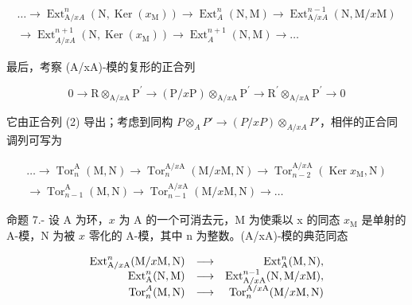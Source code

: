 \[
\begin{array}{c} \dots \longrightarrow \operatorname{Ext} _ {\mathrm{A} / x A} ^ {n} (\mathrm{N}, \operatorname{Ker} (x _ {\mathrm{M}})) \longrightarrow \operatorname{Ext} _ {A} ^ {n} (\mathrm{N}, \mathrm{M}) \longrightarrow \operatorname{Ext} _ {\mathrm{A} / x A} ^ {n - 1} (\mathrm{N}, \mathrm{M} / x \mathrm{M}) \\ \longrightarrow \operatorname{Ext} _ {A / x A} ^ {n + 1} (\mathrm{N}, \operatorname{Ker} (x _ {\mathrm{M}})) \longrightarrow \operatorname{Ext} _ {A} ^ {n + 1} (\mathrm{N}, \mathrm{M}) \longrightarrow \dots \end{array}\tag{5}
\]

最后，考察 (A/xA)-模的复形的正合列

\[
0 \rightarrow \mathrm{R} \otimes_ {\mathrm{A} / x \mathrm{A}} \mathrm{P} ^ {\prime} \longrightarrow (\mathrm{P} / x \mathrm{P}) \otimes_ {\mathrm{A} / x \mathrm{A}} \mathrm{P} ^ {\prime} \longrightarrow \mathrm{R} ^ {\prime} \otimes_ {\mathrm{A} / x \mathrm{A}} \mathrm{P} ^ {\prime} \rightarrow 0
\]

它由正合列 (2) 导出；考虑到同构 \(P \otimes_{A} P' \longrightarrow (P/xP) \otimes_{A/xA} P'\)，相伴的正合同调列可写为

\[
\begin{array}{c} \ldots \longrightarrow \operatorname{Tor} _ {n} ^ {\mathrm{A}} (\mathrm{M}, \mathrm{N}) \longrightarrow \operatorname{Tor} _ {n} ^ {\mathrm{A} / x \mathrm{A}} (\mathrm{M} / x \mathrm{M}, \mathrm{N}) \longrightarrow \operatorname{Tor} _ {n - 2} ^ {\mathrm{A} / x \mathrm{A}} (\operatorname{Ker} x _ {\mathrm{M}}, \mathrm{N}) \\ \longrightarrow \operatorname{Tor} _ {n - 1} ^ {\mathrm{A}} (\mathrm{M}, \mathrm{N}) \longrightarrow \operatorname{Tor} _ {n - 1} ^ {\mathrm{A} / x \mathrm{A}} (\mathrm{M} / x \mathrm{M}, \mathrm{N}) \longrightarrow \ldots \end{array}\tag{6}
\]

命题 7.- 设 A 为环，\(x\) 为 A 的一个可消去元，M 为使乘以 x 的同态 \(x_{\mathrm{M}}\) 是单射的 A-模，N 为被 \(x\) 零化的 A-模，其中 n 为整数。(A/xA)-模的典范同态

\[
\begin{array}{r l r} \mathrm{Ext} _ {\mathrm{A} / x \mathrm{A}} ^ {n} (\mathrm{M} / x \mathrm{M}, \mathrm{N}) & \longrightarrow & \mathrm{Ext} _ {\mathrm{A}} ^ {n} (\mathrm{M}, \mathrm{N}), \\ \mathrm{Ext} _ {\mathrm{A}} ^ {n} (\mathrm{N}, \mathrm{M}) & \longrightarrow & \mathrm{Ext} _ {\mathrm{A} / x \mathrm{A}} ^ {n - 1} (\mathrm{N}, \mathrm{M} / x \mathrm{M}), \\ \mathrm{Tor} _ {n} ^ {A} (\mathrm{M}, \mathrm{N}) & \longrightarrow & \mathrm{Tor} _ {n} ^ {\mathrm{A} / x \mathrm{A}} (\mathrm{M} / x \mathrm{M}, \mathrm{N}) \end{array}
\]

